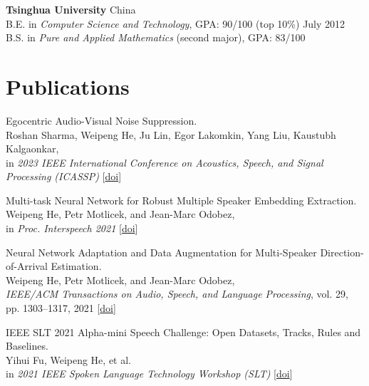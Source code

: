 \documentclass[a4paper,9pt]{extarticle} %
\newcommand{\ind}{\hspace*{1em}}
\begin{document}
\parbox{\textwidth}{%
\textbf{Tsinghua University} \hfill China \\
\ind{} B.E. in \textit{Computer Science and Technology}, GPA\@: 90/100 (top 10\%) \hfill July 2012 \\
\ind{} B.S. in \textit{Pure and Applied Mathematics} (second major), GPA\@: 83/100 %
}


\section{Publications}
\begin{enumerate}[label={[\arabic*]}]
  \item Egocentric Audio-Visual Noise Suppression. \\
        Roshan Sharma, Weipeng He, Ju Lin, Egor Lakomkin, Yang Liu, Kaustubh Kalgaonkar, \\
        in \textit{2023 IEEE International Conference on Acoustics, Speech, and Signal Processing (ICASSP)}
        [\href{https://doi.org/10.1109/ICASSP49357.2023.10095890}{doi}]

  \item Multi-task Neural Network for Robust Multiple Speaker Embedding Extraction. \\
        Weipeng He, Petr Motlicek, and Jean-Marc Odobez, \\
        in \textit{Proc. Interspeech 2021}
        [\href{https://doi.org/10.21437/Interspeech.2021-1769}{doi}]

  \item Neural Network Adaptation and Data Augmentation for Multi-Speaker Direction-of-Arrival Estimation. \\
        Weipeng He, Petr Motlicek, and Jean-Marc Odobez, \\
        \textit{IEEE/ACM Transactions on Audio, Speech, and Language Processing}, vol. 29, pp. 1303–1317, 2021
        [\href{https://doi.org/10.1109/TASLP.2021.3060257}{doi}]

  \item IEEE SLT 2021 Alpha-mini Speech Challenge: Open Datasets, Tracks, Rules and Baselines. \\
        Yihui Fu, Weipeng He, et al. \\
        in \textit{2021 IEEE Spoken Language Technology Workshop (SLT)}
        [\href{https://doi.org/10.1109/SLT48900.2021.9383546}{doi}]


\end{enumerate}
\end{document}
